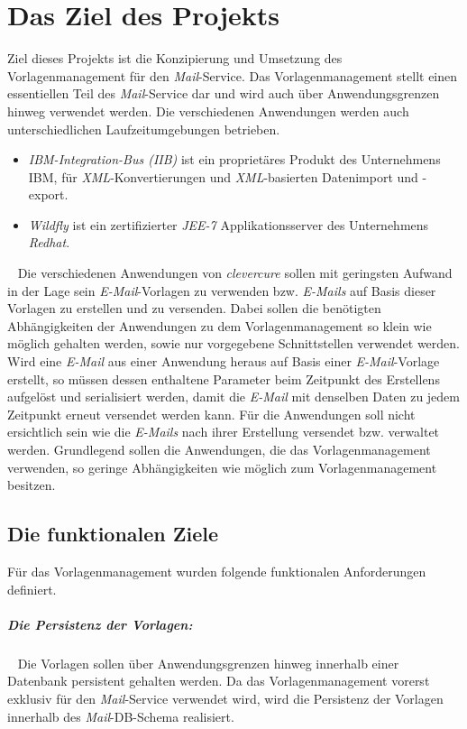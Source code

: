 \chapter{Das Ziel des Projekts}
\label{cha:Zielsetzung}
Ziel dieses Projekts ist die Konzipierung und Umsetzung des Vorlagenmanagement für den \emph{Mail}-Service. Das Vorlagenmanagement stellt einen essentiellen Teil des \emph{Mail}-Service dar und wird auch über Anwendungsgrenzen hinweg verwendet werden. Die verschiedenen Anwendungen werden auch unterschiedlichen Laufzeitumgebungen betrieben.
\begin{itemize}
	\item\emph{IBM-Integration-Bus (IIB)}
	\newline
	ist ein proprietäres Produkt des Unternehmens IBM, für \emph{XML}-Konvertierungen und \emph{XML}-basierten Datenimport und -export.
	\item\emph{Wildfly}
	\newline
	ist ein zertifizierter \emph{JEE-7} Applikationsserver des Unternehmens \emph{Redhat}.
\end{itemize} 
\ \newline
Die verschiedenen Anwendungen von \emph{clevercure} sollen mit geringsten Aufwand in der Lage sein \emph{E-Mail}-Vorlagen zu verwenden bzw. \emph{E-Mails} auf Basis dieser Vorlagen zu erstellen und zu versenden. Dabei sollen die benötigten Abhängigkeiten der Anwendungen zu dem Vorlagenmanagement so klein wie möglich gehalten werden, sowie nur vorgegebene Schnittstellen verwendet werden.  
\newline
Wird eine \emph{E-Mail} aus einer Anwendung heraus auf Basis einer \emph{E-Mail}-Vorlage erstellt, so müssen dessen enthaltene Parameter beim Zeitpunkt des Erstellens aufgelöst und serialisiert werden, damit die \emph{E-Mail} mit denselben Daten zu jedem Zeitpunkt erneut versendet werden kann. Für die Anwendungen soll nicht ersichtlich sein wie die \emph{E-Mails} nach ihrer Erstellung versendet bzw. verwaltet werden. Grundlegend sollen die Anwendungen, die das Vorlagenmanagement verwenden, so geringe Abhängigkeiten wie möglich zum Vorlagenmanagement besitzen.

\section{Die funktionalen Ziele}
Für das Vorlagenmanagement wurden folgende funktionalen Anforderungen definiert.

\paragraph{Die Persistenz der Vorlagen:}
\ \newline
Die Vorlagen sollen über Anwendungsgrenzen hinweg innerhalb einer Datenbank persistent gehalten werden. Da das Vorlagenmanagement vorerst exklusiv für den \emph{Mail}-Service verwendet wird, wird die Persistenz der Vorlagen innerhalb des \emph{Mail}-DB-Schema realisiert.


